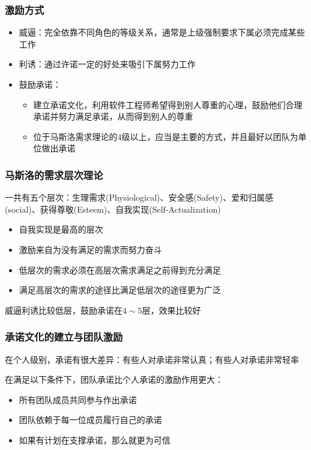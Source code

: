 \subsubsection{激励方式}
\begin{itemize}
    \item 威逼：完全依靠不同角色的等级关系，通常是上级强制要求下属必须完成某些工作
    \item 利诱：通过许诺一定的好处来吸引下属努力工作
    \item 鼓励承诺：
    \begin{itemize}
        \item 建立承诺文化，利用软件工程师希望得到别人尊重的心理，鼓励他们合理承诺并努力满足承诺，从而得到别人的尊重
        \item 位于马斯洛需求理论的4级以上，应当是主要的方式，并且最好以团队为单位做出承诺
    \end{itemize}
\end{itemize}



\subsubsection{马斯洛的需求层次理论}
一共有五个层次：生理需求(Physiological)、安全感(Safety)、爱和归属感(social)、获得尊敬(Esteem)、自我实现(Self-Actualization)
\vspace{-0.8em}
\begin{multicols}{2}
    \begin{itemize}
        \item 自我实现是最高的层次
        \item 激励来自为没有满足的需求而努力奋斗
        \item 低层次的需求必须在高层次需求满足之前得到充分满足
        \item 满足高层次的需求的途径比满足低层次的途径更为广泛
    \end{itemize}
\end{multicols}
\vspace{-1em}

威逼利诱比较低层，鼓励承诺在$4\sim 5$层，效果比较好

\subsubsection{承诺文化的建立与团队激励}
在个人级别，承诺有很大差异：有些人对承诺非常认真；有些人对承诺非常轻率

在满足以下条件下，团队承诺比个人承诺的激励作用更大：
\vspace{-0.8em}
\begin{multicols}{2}
    \begin{itemize}
        \item 所有团队成员共同参与作出承诺
        \item 团队依赖于每一位成员履行自己的承诺
        \item 如果有计划在支撑承诺，那么就更为可信
    \end{itemize}
\end{multicols}
\vspace{-1em}

